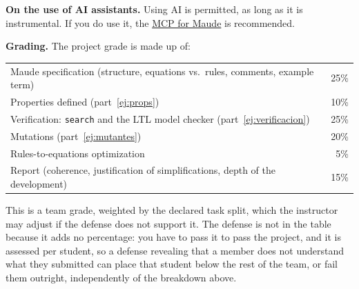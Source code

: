 \smallskip
\noindent\textbf{On the use of AI assistants.} Using AI is permitted, as
long as it is instrumental. If you do use it, the
\href{https://pypi.org/project/harold-mcp/}{MCP for Maude} is recommended.

\bigskip
\noindent\textbf{Grading.} The project grade is made up of:

\begin{center}
\begin{tabular}{lr}
Maude specification (structure, equations vs.\ rules, comments, example term) & 25\% \\
Properties defined (part~\ref{ej:props}) & 10\% \\
Verification: \texttt{search} and the LTL model checker (part~\ref{ej:verificacion}) & 25\% \\
Mutations (part~\ref{ej:mutantes}) & 20\% \\
Rules-to-equations optimization & 5\% \\
Report (coherence, justification of simplifications, depth of the development) & 15\% \\
\end{tabular}
\end{center}

\noindent This is a team grade, weighted by the declared task split, which
the instructor may adjust if the defense does not support it. The defense
is not in the table because it adds no percentage: you have to pass it to
pass the project, and it is assessed per student, so a defense revealing
that a member does not understand what they submitted can place that
student below the rest of the team, or fail them outright, independently of
the breakdown above.


